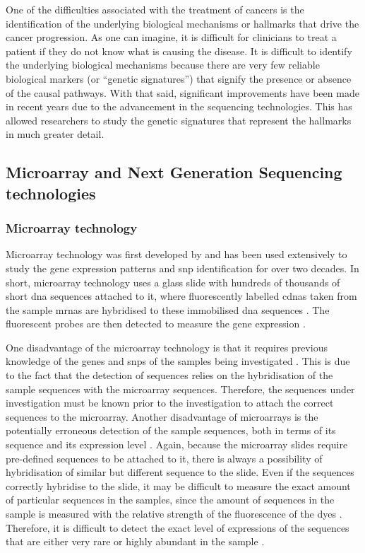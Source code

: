 One of the difficulties associated with the treatment of cancers is the identification of the underlying biological mechanisms or hallmarks that drive the cancer progression.
As one can imagine, it is difficult for clinicians to treat a patient if they do not know what is causing the disease.
It is difficult to identify the underlying biological mechanisms because there are very few reliable biological markers (or ``genetic signatures'') that signify the presence or absence of the causal pathways.
With that said, significant improvements have been made in recent years due to the advancement in the sequencing technologies.
This has allowed researchers to study the genetic signatures that represent the hallmarks in much greater detail.

\subsection{Microarray and Next Generation Sequencing technologies}
\label{sub:microarray_and_next_generation_sequencing_technologies}

\subsubsection{Microarray technology}
\label{ssub:microarray_technology}

Microarray technology was first developed by \citet{Schena1995} and has been used extensively to study the gene expression patterns and \gls{snp} identification for over two decades.
In short, microarray technology uses a glass slide with hundreds of thousands of short \acrshort{dna} sequences attached to it, where fluorescently labelled \glspl{cdna} taken from the sample \glspl{mrna} are hybridised to these immobilised \acrshort{dna} sequences \citep{Schena1995,Schulze2001}.
The fluorescent probes are then detected to measure the gene expression \citep{Schena1995,Schulze2001}.

One disadvantage of the microarray technology is that it requires previous knowledge of the genes and \glspl{snp} of the samples being investigated \citep{Hurd2009}.
This is due to the fact that the detection of sequences relies on the hybridisation of the sample sequences with the microarray sequences.
Therefore, the sequences under investigation must be known prior to the investigation to attach the correct sequences to the microarray.
Another disadvantage of microarrays is the potentially erroneous detection of the sample sequences, both in terms of its sequence and its expression level \citep{Hurd2009}.
Again, because the microarray slides require pre-defined sequences to be attached to it, there is always a possibility of hybridisation of similar but different sequence to the slide.
Even if the sequences correctly hybridise to the slide, it may be difficult to measure the exact amount of particular sequences in the samples, since the amount of sequences in the sample is measured with the relative strength of the fluorescence of the dyes \citep{Hurd2009}.
Therefore, it is difficult to detect the exact level of expressions of the sequences that are either very rare or highly abundant in the sample \citep{Hurd2009}.

